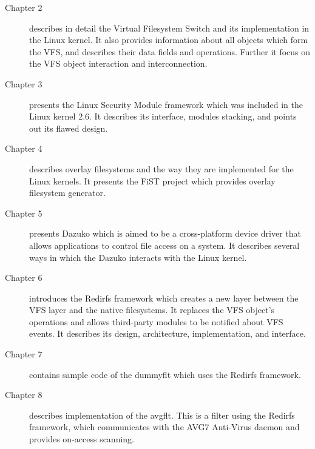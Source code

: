 \begin{description}
	\item [Chapter 2]
		describes in detail the Virtual Filesystem Switch and its
		implementation in the Linux kernel. It also provides information about
		all objects which form the VFS, and describes their data fields and
		operations. Further it focus on the VFS object interaction and
		interconnection.
		
	\item [Chapter 3]
		presents the Linux Security Module framework which was included in the
		Linux kernel 2.6. It describes its interface, modules stacking, and
		points out its flawed design.

	\item [Chapter 4]
		describes overlay filesystems and the way they are implemented for the
		Linux kernels. It presents the FiST project which provides overlay
		filesystem generator.

	\item [Chapter 5]
		presents Dazuko which is aimed to be a cross-platform device driver
		that allows applications to control file access on a system. It
		describes several ways in which the Dazuko interacts with the Linux
		kernel.

	\item [Chapter 6]
		introduces the Redirfs framework which creates a new layer between the
		VFS layer and the native filesystems. It replaces the VFS object's
		operations and allows third-party modules to be notified about VFS
		events. It describes its design, architecture, implementation, and
		interface.

	\item [Chapter 7] 
		contains sample code of the dummyflt which uses the Redirfs framework.

	\item [Chapter 8] 
		describes implementation of the avgflt. This is a filter using the
		Redirfs framework, which communicates with the AVG7 Anti-Virus daemon
		and provides on-access scanning.
\end{description}
